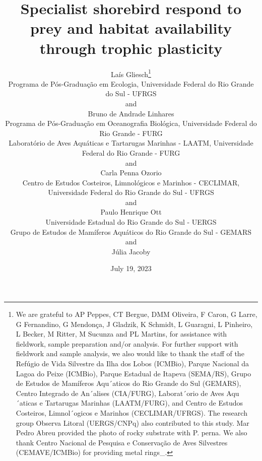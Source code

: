 \documentclass[
  12pt]{article}
\begin{document}
\def\spacingset#1{\renewcommand{\baselinestretch}%
{#1}\small\normalsize} \spacingset{1}



\date{July 19, 2023}
\title{\bf Specialist shorebird respond to prey and habitat availability
through trophic plasticity}
\author{
Laís Gliesch\thanks{We are grateful to AP Peppes, CT Bergue, DMM
Oliveira, F Caron, G Larre, G Fernandino, G Mendonça, J Gladzik, K
Schmidt, L Guaragni, L Pinheiro, L Becker, M Ritter, M Sucunza and PL
Martins, for assistance with fieldwork, sample preparation and/or
analysis. For further support with fieldwork and sample analysis, we
also would like to thank the staff of the Refúgio de Vida Silvestre da
Ilha dos Lobos (ICMBio), Parque Nacional da Lagoa do Peixe (ICMBio),
Parque Estadual de Itapeva (SEMA/RS), Grupo de Estudos de Mamíferos
Aqu´aticos do Rio Grande do Sul (GEMARS), Centro Integrado de An´alises
(CIA/FURG), Laborat´orio de Aves Aqu´aticas e Tartarugas Marinhas
(LAATM/FURG), and Centro de Estudos Costeiros, Limnol´ogicos e Marinhos
(CECLIMAR/UFRGS). The research group Observa Litoral (UERGS/CNPq) also
contributed to this study. Mar Pedro Abreu provided the photo of rocky
substrate with P. perna. We also thank Centro Nacional de Pesquisa e
Conservação de Aves Silvestres (CEMAVE/ICMBio) for providing metal
rings\_.}\\
Programa de Pós-Graduação em Ecologia, Universidade Federal do Rio
Grande do Sul - UFRGS\\
and\\Bruno de Andrade Linhares\\
Programa de Pós-Graduação em Oceanografia Biológica, Universidade
Federal do Rio Grande - FURG\\
Laboratório de Aves Aquáticas e Tartarugas Marinhas -
LAATM, Universidade Federal do Rio Grande - FURG\\
and\\Carla Penna Ozorio\\
Centro de Estudos Costeiros, Limnológicos e Marinhos -
CECLIMAR, Universidade Federal do Rio Grande do Sul - UFRGS\\
and\\Paulo Henrique Ott\\
Universidade Estadual do Rio Grande do Sul - UERGS\\
Grupo de Estudos de Mamíferos Aquáticos do Rio Grande do Sul - GEMARS\\
and\\Júlia Jacoby\\
}
\end{document}

